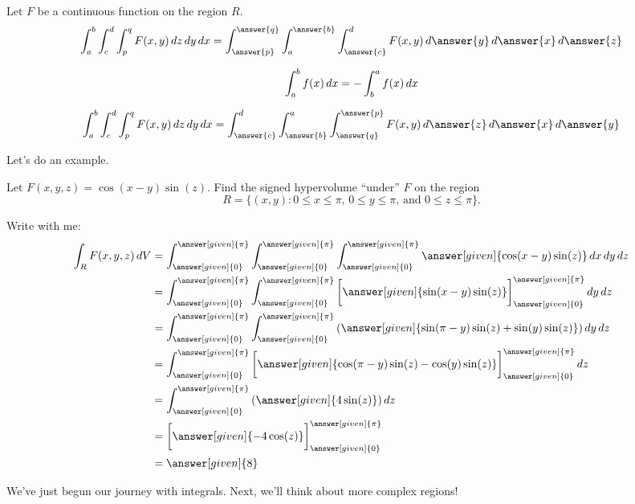 \documentclass{ximera}
\begin{document}
\begin{question}
  Let $F$ be a continuous function on the region $R$.
  \[
  \int_a^b\int_c^d\int_p^q F(x,y)\d z \d y\d x =
  \int_{\answer{p}}^{\answer{q}}\int_a^{\answer{b}}
  \int_{\answer{c}}^d F(x,y)\d \answer{y} \d \answer{x} \d \answer{z}
  \]
  \begin{question}
    \begin{hint}
      \[
      \int_a^b f(x) \mathop{}\!d x = - \int_b^a f(x) \mathop{}\!d x
      \]
    \end{hint}
    \[
    \int_a^b\int_c^d\int_p^q F(x,y)\d z \d y\d x = \int_{\answer{c}}^{d}
    \int_{\answer{b}}^{a}\int_{\answer{q}}^{\answer{p}}
    F(x,y)\d \answer{z} \d \answer{x} \d \answer{y}
    \]
  \end{question}
\end{question}

Let's do an example.


\begin{example}
  Let $F(x,y,z) = \cos(x-y)\sin(z)$. Find the signed hypervolume ``under'' $F$ on the region
  \[
  R = \{(x,y):\text{$0\le x\le \pi$, $0\le y\le \pi$, and $0\le z\le \pi$}\}.
  \]
  \begin{explanation}
    Write with me:
    \begin{align*}
      \int_R F(x,y,z) \d V &=\int_{\answer[given]{0}}^{\answer[given]{\pi}}\int_{\answer[given]{0}}^{\answer[given]{\pi}}\int_{\answer[given]{0}}^{\answer[given]{\pi}} \answer[given]{\cos(x-y)\sin(z)} \d x \d y \d z \\
      &= \int_{\answer[given]{0}}^{\answer[given]{\pi}}\int_{\answer[given]{0}}^{\answer[given]{\pi}}\eval{\answer[given]{\sin(x-y)\sin(z)}}_{\answer[given]{0}}^{\answer[given]{\pi}}\d y \d z \\
      &= \int_{\answer[given]{0}}^{\answer[given]{\pi}}\int_{\answer[given]{0}}^{\answer[given]{\pi}}\left(\answer[given]{\sin(\pi-y)\sin(z) + \sin(y)\sin(z)}\right)\d y \d z \\
      &= \int_{\answer[given]{0}}^{\answer[given]{\pi}}\eval{\answer[given]{\cos(\pi-y)\sin(z) -\cos(y)\sin(z)}}_{\answer[given]{0}}^{\answer[given]{\pi}} \d z \\
      &= \int_{\answer[given]{0}}^{\answer[given]{\pi}}\left(\answer[given]{4\sin(z)}\right) \d z \\
      &= \eval{\answer[given]{-4\cos(z)}}_{\answer[given]{0}}^{\answer[given]{\pi}} \\
      &= \answer[given]{8}
    \end{align*}
  \end{explanation}
\end{example}

We've just begun our journey with integrals. Next, we'll think about more complex regions!
\end{document}
